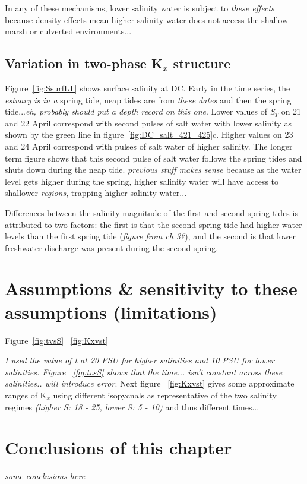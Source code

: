 In any of these mechanisms, lower salinity water is subject to \emph{these effects} because density effects mean higher salinity water does not access the shallow marsh or culverted environments... 

\subsection{Variation in two-phase K$_x$ structure}
Figure~\ref{fig:SsurfLT} shows surface salinity at DC. Early in the time series, the \emph{estuary is in a} spring tide, neap tides are from \emph{these dates} and then the spring tide...\emph{eh, probably should put a depth record on this one}. Lower values of \emph{S$_T$} on 21 and 22 April correspond with second pulses of salt water with lower salinity as shown by the green line in figure~\ref{fig:DC_salt_421_425}c. Higher values on 23 and 24 April correspond with pulses of salt water of higher salinity. The longer term figure shows that this second pulse of salt water follows the spring tides and shuts down during the neap tide. \emph{previous stuff makes sense} because as the water level gets higher during the spring, higher salinity water will have access to shallower \emph{regions}, trapping higher salinity water... 

Differences between the salinity magnitude of the first and second spring tides is attributed to two factors: the first is that the second spring tide had higher water levels than the first spring tide (\emph{figure from ch 3?}), and the second is that lower freshwater discharge was present during the second spring. 

\section{Assumptions \& sensitivity to these assumptions (limitations)}

Figure~\ref{fig:tvsS} ~\ref{fig:Kxvst}

\emph{I used the value of t at 20 PSU for higher salinities and 10 PSU for lower salinities.  Figure ~\ref{fig:tvsS} shows that the time... isn't constant across these salinities.. will introduce error}.  Next figure ~\ref{fig:Kxvst} gives some approximate ranges of K$_x$ using different isopycnals as representative of the two salinity regimes \emph{(higher S: 18 - 25, lower S: 5 - 10)} and thus different times... 




\section{Conclusions of this chapter}
\emph{some conclusions here}


